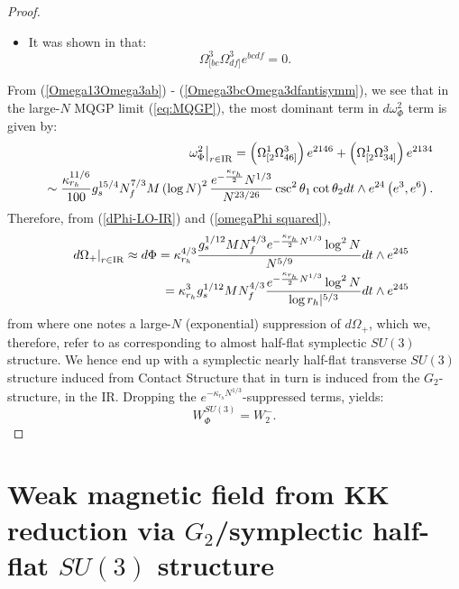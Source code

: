\documentclass[a4paper,11pt,fleqn]{article}
\theoremstyle{plain}
\theoremstyle{definition}
\begin{document}
\begin{proof}
\begin{itemize}
\item 
It was shown in \cite{ACMS} that:
\begin{equation}
\label{Omega3bcOmega3dfantisymm}
\Omega^3_{[bc}\Omega^3_{df]}e^{bcdf} = 0.
\end{equation}
\end{itemize}
From (\ref{Omega13Omega3ab}) - (\ref{Omega3bcOmega3dfantisymm}), we see that in the large-$N$ MQGP limit (\ref{eq:MQGP}), the most dominant term in $d\omega_\Phi^2$ term is given by:
\begin{eqnarray}
\label{omegaPhi squared}
& & \left.\omega_\Phi^2\right|_{r\in{\rm IR}} = \left(\Omega^1_{[2}\Omega^3_{46]}\right)e^{2146} + \left(\Omega^1_{[2}\Omega^3_{34]}\right)e^{2134}\nonumber\\
& & \sim \frac{\kappa_{r_h}^{11/6}}{100}g_s^{15/4}N_f^{7/3}M \left(\log N\right)^2\frac{e^{-\frac{\kappa_{r_h}}{2}}N^{1/3}}{N^{23/26}}\csc^2\theta_1\cot\theta_2dt\wedge e^{24}\left(e^3, e^6\right).
\end{eqnarray}
Therefore, from (\ref{dPhi-LO-IR}) and (\ref{omegaPhi squared}),
\begin{eqnarray}
& & \left.d\Omega_+\right|_{r\in{\rm IR}}\approx d\Phi = \kappa_{r_h}^{4/3}\frac{g_s^{1/12}M N_f^{4/3}e^{-\frac{\kappa_{r_h}}{2}N^{1/3}}\log^2N}{N^{5/9}}dt\wedge e^{245}\nonumber\\
& & = \kappa_{r_h}^3g_s^{1/12}M N_f^{4/3}\frac{e^{-\frac{\kappa_{r_h}}{2}N^{1/3}}\log^2N}{\log r_h|^{5/3}}dt\wedge e^{245}
\label{eq:dOmegaIR}
\end{eqnarray}
from where one notes a large-$N$ (exponential) suppression of $d\Omega_+$, which we, therefore, refer to as corresponding to almost half-flat symplectic $SU(3)$ structure. We hence end up with a symplectic nearly half-flat transverse $SU(3)$ structure induced from Contact Structure that in turn is induced from the $G_2$-structure, in the IR. Dropping the $e^{-\kappa_{r_h}N^{1/3}}$-suppressed terms, yields:
\begin{equation}
\label{Ws}
W_\Phi^{SU(3)} = W_2^-.
\end{equation}
\end{proof}

\section{Weak magnetic field from KK reduction via $G_2$/symplectic half-flat $SU(3)$ structure}
\end{document}
